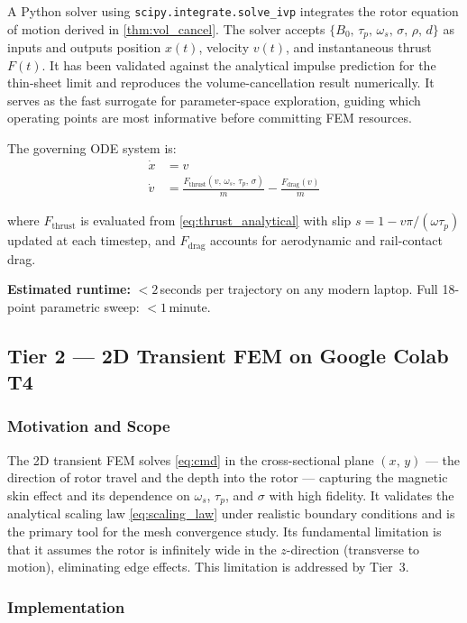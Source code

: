 \documentclass[12pt,letterpaper]{article}
\begin{document}
A Python solver using \texttt{scipy.integrate.solve\_ivp} integrates the rotor
equation of motion derived in \cref{thm:vol_cancel}. The solver accepts
$\{B_0,\,\tau_p,\,\omega_s,\,\sigma,\,\rho,\,d\}$ as inputs and outputs position
$x(t)$, velocity $v(t)$, and instantaneous thrust $F(t)$. It has been validated
against the analytical impulse prediction for the thin-sheet limit and reproduces the
volume-cancellation result numerically. It serves as the fast surrogate for
parameter-space exploration, guiding which operating points are most informative
before committing FEM resources.

The governing ODE system is:
\begin{align}
  \dot{x} &= v \label{eq:ode1}\\
  \dot{v} &= \frac{F_{\mathrm{thrust}}(v,\,\omega_s,\,\tau_p,\,\sigma)}{m}
             - \frac{F_{\mathrm{drag}}(v)}{m} \label{eq:ode2}
\end{align}

where $F_{\mathrm{thrust}}$ is evaluated from \cref{eq:thrust_analytical} with slip
$s = 1 - v\pi/(\omega\tau_p)$ updated at each timestep, and $F_{\mathrm{drag}}$
accounts for aerodynamic and rail-contact drag.

\textbf{Estimated runtime:} $< 2$\,seconds per trajectory on any modern laptop.
Full 18-point parametric sweep: $< 1$\,minute.

\subsection{Tier 2 — 2D Transient FEM on Google Colab T4}
\label{sec:tier2}

\subsubsection{Motivation and Scope}

The 2D transient FEM solves \cref{eq:cmd} in the cross-sectional plane
$(x,\,y)$ — the direction of rotor travel and the depth into the rotor —
capturing the magnetic skin effect and its dependence on $\omega_s$, $\tau_p$,
and $\sigma$ with high fidelity. It validates the analytical scaling law
\cref{eq:scaling_law} under realistic boundary conditions and is the primary
tool for the mesh convergence study. Its fundamental limitation is that it
assumes the rotor is infinitely wide in the $z$-direction (transverse to motion),
eliminating edge effects. This limitation is addressed by Tier~3.

\subsubsection{Implementation}
\end{document}
